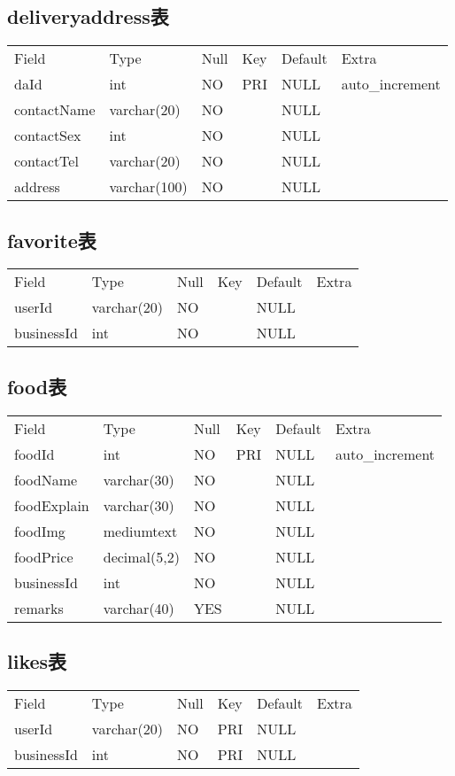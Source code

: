 \subsection{deliveryaddress表}

\begin{longtable}[]{@{}llllll@{}}
\toprule
Field & Type & Null & Key & Default & Extra\tabularnewline
daId & int & NO & PRI & NULL & auto\_increment\tabularnewline
contactName & varchar(20) & NO & & NULL &\tabularnewline
contactSex & int & NO & & NULL &\tabularnewline
contactTel & varchar(20) & NO & & NULL &\tabularnewline
address & varchar(100) & NO & & NULL &\tabularnewline
\bottomrule
\end{longtable}

\subsection{favorite表}

\begin{longtable}[]{@{}llllll@{}}
\toprule
Field & Type & Null & Key & Default & Extra\tabularnewline
userId & varchar(20) & NO & & NULL &\tabularnewline
businessId & int & NO & & NULL &\tabularnewline
\bottomrule
\end{longtable}

\subsection{food表}

\begin{longtable}[]{@{}llllll@{}}
\toprule
Field & Type & Null & Key & Default & Extra\tabularnewline
foodId & int & NO & PRI & NULL & auto\_increment\tabularnewline
foodName & varchar(30) & NO & & NULL &\tabularnewline
foodExplain & varchar(30) & NO & & NULL &\tabularnewline
foodImg & mediumtext & NO & & NULL &\tabularnewline
foodPrice & decimal(5,2) & NO & & NULL &\tabularnewline
businessId & int & NO & & NULL &\tabularnewline
remarks & varchar(40) & YES & & NULL &\tabularnewline
\bottomrule
\end{longtable}

\subsection{likes表}

\begin{longtable}[]{@{}llllll@{}}
\toprule
Field & Type & Null & Key & Default & Extra\tabularnewline
userId & varchar(20) & NO & PRI & NULL &\tabularnewline
businessId & int & NO & PRI & NULL &\tabularnewline
\bottomrule
\end{longtable}

